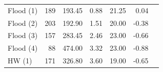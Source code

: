 \documentclass[doublespacing,linenumbers]{bmcart}
\begin{document}
\begin{backmatter}
\begin{table}[]
\begin{tabular}{lrrrrrr}
Flood (1)                                               & 189                                               & 193.45                                             & 0.88                                                        & 21.25                                                     & 0.04                                                             \\
Flood (2)                                               & 203                                               & 192.90                                             & 1.51                                                        & 20.00                                                     & -0.38                                                            \\
Flood (3)                                               & 157                                               & 283.45                                             & 2.46                                                        & 23.00                                                     & -0.66                                                            \\
Flood (4)                                               & 88                                                & 474.00                                             & 3.32                                                        & 23.00                                                     & -0.88                                                            \\
HW (1)                                                  & 171                                               & 326.80                                             & 3.60                                                        & 19.00                                                     & -0.65                                                          \\ \hline
\end{tabular}
\label{tab:DR_tide}
\end{table}


\end{backmatter}
\end{document}

